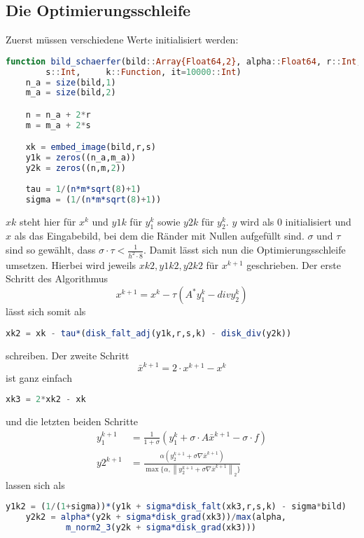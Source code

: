 \documentclass{article}
\theoremstyle{case}
\newcommand{\norm}[1]{\left\lVert#1\right\rVert}
\begin{document}

\subsection{Die Optimierungsschleife}

Zuerst müssen verschiedene Werte initialisiert werden:
\begin{lstlisting}[language=Julia]
function bild_schaerfer(bild::Array{Float64,2}, alpha::Float64, r::Int, 
		s::Int, 	k::Function, it=10000::Int)
	n_a = size(bild,1)
	m_a = size(bild,2)

	n = n_a + 2*r
	m = m_a + 2*s

	xk = embed_image(bild,r,s)
	y1k = zeros((n_a,m_a))
	y2k = zeros((n,m,2))
	
	tau = 1/(n*m*sqrt(8)+1)
	sigma = (1/(n*m*sqrt(8)+1))
\end{lstlisting}
$xk$ steht hier für $x^{k}$ und $y1k$ für $y_{1}^{k}$ sowie $y2k$ für $y_{2}^{k}$. $y$ wird als $0$ initialisiert und $x$ als das Eingabebild, bei dem die Ränder mit Nullen aufgefüllt sind. $\sigma$ und $\tau$ sind so gewählt, dass $\sigma\cdot \tau < \frac{1}{h^{2}\cdot 8}$. Damit lässt sich nun die Optimierungsschleife umsetzen. Hierbei wird jeweils $xk2, y1k2,y2k2$ für $x^{k+1}$ geschrieben. Der erste Schritt des Algorithmus
\[
x^{k+1} = x^{k} - \tau (A^{*}y_{1}^{k} - div y_{2}^{k})
\]
lässt sich somit als
\begin{lstlisting}[language=Julia]
	xk2 = xk - tau*(disk_falt_adj(y1k,r,s,k) - disk_div(y2k))
\end{lstlisting}
schreiben.
Der zweite Schritt
\[
\bar{x}^{k+1} = 2\cdot x^{k+1} - x^{k}
\]
ist ganz einfach
\begin{lstlisting}[language=Julia]
	xk3 = 2*xk2 - xk
\end{lstlisting}
und die letzten beiden Schritte
\begin{align*}
y_{1}^{k+1} &= \frac{1}{1+\sigma} (y_{1}^{k} + \sigma\cdot A \bar{x}^{k+1} - \sigma\cdot f) \\
y{2}^{k+1} &= \frac{\alpha (y_{2}^{k+1} + \sigma \nabla \bar{x}^{k+1} )}{\max\{\alpha, \norm{y_{2}^{k+1} + \sigma \nabla \bar{x}^{k+1} }_{2}\}}
\end{align*}
lassen sich als
\begin{lstlisting}[language=Julia]
	y1k2 = (1/(1+sigma))*(y1k + sigma*disk_falt(xk3,r,s,k) - sigma*bild)
	y2k2 = alpha*(y2k + sigma*disk_grad(xk3))/max(alpha, 
			m_norm2_3(y2k + sigma*disk_grad(xk3)))
\end{lstlisting}
\end{document}
